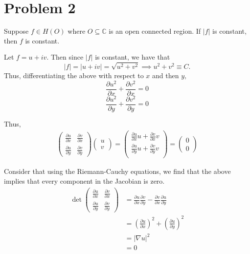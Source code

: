 \documentclass[11pt]{article}
\newcommand{\bbC}{\mathbb{C}}
\begin{document}
\section*{Problem 2}
\begin{problem}
    Suppose $f \in H(O)$ where $O\subseteq \bbC$ is an open connected region. If $|f|$ is constant, then $f$ is constant.
\end{problem}
\begin{solution}
    Let $f = u + iv.$ Then since $|f|$ is constant, we have that 
    \[|f| = |u + iv| = \sqrt{u^2 + v^2} \implies u^2 + v^2 \equiv C.\]
    Thus, differentiating the above with respect to $x$ and then $y,$
\[\frac{\partial u^2}{\partial x} + \frac{\partial v^2}{\partial x} = 0\]
\[\frac{\partial u^2}{\partial y} + \frac{\partial v^2}{\partial y} = 0\]

    Thus,
    \begin{align}
\begin{pmatrix}
        \frac{\partial u}{\partial x} & \frac{\partial v}{\partial x}\\
        \frac{\partial u}{\partial y} & \frac{\partial v}{\partial y}
    \end{pmatrix}\begin{pmatrix}
        u\\v
    \end{pmatrix} = \begin{pmatrix}
        \frac{\partial u}{\partial x}u + \frac{\partial v}{\partial x}v\\
        \frac{\partial u}{\partial y}u + \frac{\partial v}{\partial y}v\\
    \end{pmatrix}
    = \begin{pmatrix}
        0\\0
    \end{pmatrix}        
    \end{align}

Consider that using the Riemann-Cauchy equations, we find that the above implies that every component in the Jacobian is zero.
\begin{align*}
\det \begin{pmatrix}
        \frac{\partial u}{\partial x} & \frac{\partial v}{\partial x}\\
        \frac{\partial u}{\partial y} & \frac{\partial v}{\partial y}
    \end{pmatrix}
    &= \frac{\partial u}{\partial x}\frac{\partial v}{\partial y} - 
    \frac{\partial v}{\partial x}\frac{\partial u}{\partial y}\\ &= (\frac{\partial u}{\partial x})^2 + (\frac{\partial u}{\partial y})^2\\
    &= |\nabla u|^2\\
    &= 0
    \end{align*}
    

\end{solution}
\end{document}
